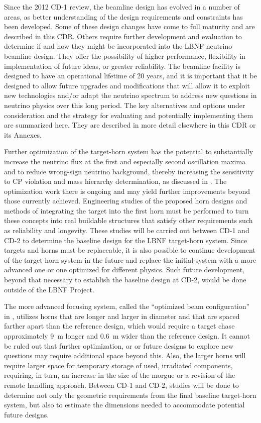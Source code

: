 Since the 2012 CD-1 review, the beamline design has evolved in a number of areas, as better understanding of the design requirements and constraints has been developed.  Some of these design changes have come to full maturity and are 
described in this CDR.  Others require further development and evaluation to determine if and how they might be incorporated into the LBNF neutrino beamline design.  They offer the possibility of higher performance, flexibility in 
implementation of future ideas, or greater reliability. The beamline facility is designed to have an operational lifetime of 20 years, and it is important that it be designed to allow future upgrades and modifications that will allow it to 
exploit new 
technologies and/or adapt the neutrino spectrum to address new questions in neutrino physics over this long period. The key alternatives and options under consideration and the strategy for evaluating and potentially implementing them are summarized here.  They are described in more detail elsewhere in this CDR or its Annexes.  
               
 
Further optimization of the target-horn system has the potential to substantially increase the neutrino flux at the first and especially second oscillation maxima and to reduce wrong-sign neutrino background, thereby increasing the sensitivity to CP 
violation and mass hierarchy determination, as discussed in \volphys.  The optimization work there is ongoing and may yield further improvements beyond those currently achieved. Engineering studies of the proposed horn designs and methods 
of integrating the target into the first horn must be performed to turn these concepts into real buildable structures that satisfy other requirements such as reliability and longevity.  These studies will be carried out between CD-1 and CD-2 to 
determine the baseline design for the LBNF target-horn system.  Since targets and horns must be replaceable, it is also possible to continue development of the target-horn system in the future and replace the initial system with a more advanced 
one or one optimized for different physics.  Such future development, beyond that necessary to establish the baseline design at CD-2, would be done outside of the LBNF Project.
 
The more advanced focusing system, called the ``optimized beam configuration'' in \volphys, utilizes horns that are longer and larger in diameter and that are spaced farther apart than the reference design, which would require a target chase approximately 9~m longer and 0.6~m wider 
than the reference design.  It cannot be ruled out that further optimization, or or future designs to explore new questions may require additional space beyond this.  Also, the larger horns will require larger 
space for temporary storage of used, irradiated components, requiring, in turn, an increase in the size of the morgue or a revision of the remote handling approach.  Between CD-1 and CD-2, studies will be done to determine not only the geometric 
requirements from the final baseline target-horn system, but also to estimate the dimensions needed to accommodate potential future designs.
 
